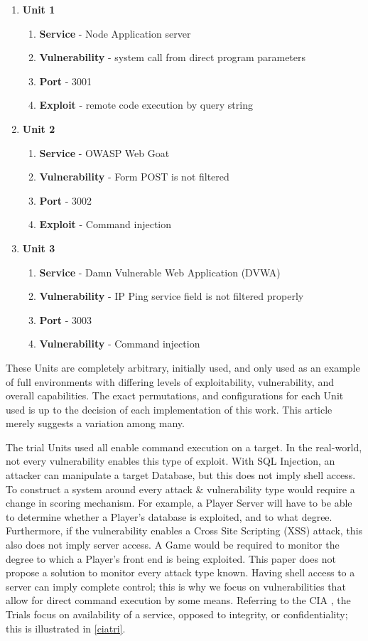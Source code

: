 \documentclass[10pt, titlepage, twocolumn]{article}
\begin{document}
\begin{enumerate}
	\item  \textbf{Unit 1}
	\begin{enumerate}
		\item \textbf{Service} - Node Application server
		\item \textbf{Vulnerability} - system call from direct program parameters
		\item \textbf{Port} - 3001
		\item \textbf{Exploit} - remote code execution by query string
	\end{enumerate}
	\item  \textbf{Unit 2}
	\begin{enumerate}
		\item \textbf{Service} - OWASP Web Goat
		\item \textbf{Vulnerability} - Form POST is not filtered
		\item \textbf{Port} - 3002
		\item \textbf{Exploit} - Command injection
	\end{enumerate}
	\item  \textbf{Unit 3}
	\begin{enumerate}	
		\item \textbf{Service} - Damn Vulnerable Web Application (DVWA)
		\item \textbf{Vulnerability} - IP Ping service field is not filtered properly
		\item \textbf{Port} - 3003
		\item \textbf{Vulnerability} - Command injection
	\end{enumerate}
\end{enumerate}

These Units are completely arbitrary, initially used, and only used as an example of full environments with differing levels of exploitability, vulnerability, and overall capabilities. The exact permutations, and configurations for each Unit used is up to the decision of each implementation of this work. This article merely suggests a variation among many.

The trial Units used all enable command execution on a target. In the real-world, not every vulnerability enables this type of exploit. With SQL Injection, an attacker can manipulate a target Database, but this does not imply shell access. To construct a system around every attack \& vulnerability type would require a change in scoring mechanism. For example, a Player Server will have to be able to determine whether a Player's database is exploited, and to what degree. Furthermore, if the vulnerability enables a Cross Site Scripting (XSS) attack, this also does not imply server access. A Game would be required to monitor the degree to which a Player's front end is being exploited. This paper does not propose a solution to monitor every attack type known. Having shell access to a server can imply complete control; this is why we focus on vulnerabilities that allow for direct command execution by some means. Referring to the CIA \cite{CIA}, the Trials focus on availability of a service, opposed to integrity, or confidentiality; this is illustrated in \ref{ciatri}.
\end{document}
